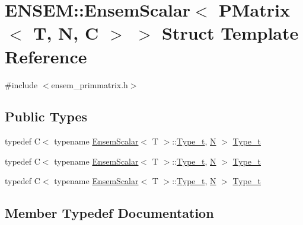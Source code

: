 \hypertarget{structENSEM_1_1EnsemScalar_3_01PMatrix_3_01T_00_01N_00_01C_01_4_01_4}{}\section{E\+N\+S\+EM\+:\+:Ensem\+Scalar$<$ P\+Matrix$<$ T, N, C $>$ $>$ Struct Template Reference}
\label{structENSEM_1_1EnsemScalar_3_01PMatrix_3_01T_00_01N_00_01C_01_4_01_4}


{\ttfamily \#include $<$ensem\+\_\+primmatrix.\+h$>$}

\subsection*{Public Types}
\begin{DoxyCompactItemize}
\item 
typedef C$<$ typename \mbox{\hyperlink{structENSEM_1_1EnsemScalar}{Ensem\+Scalar}}$<$ T $>$\+::\mbox{\hyperlink{structENSEM_1_1EnsemScalar_3_01PMatrix_3_01T_00_01N_00_01C_01_4_01_4_a63cd7ffca7507ffb61823092f6d0f8db}{Type\+\_\+t}}, \mbox{\hyperlink{adat__devel_2lib_2hadron_2operator__name__util_8cc_a7722c8ecbb62d99aee7ce68b1752f337}{N}} $>$ \mbox{\hyperlink{structENSEM_1_1EnsemScalar_3_01PMatrix_3_01T_00_01N_00_01C_01_4_01_4_a63cd7ffca7507ffb61823092f6d0f8db}{Type\+\_\+t}}
\item 
typedef C$<$ typename \mbox{\hyperlink{structENSEM_1_1EnsemScalar}{Ensem\+Scalar}}$<$ T $>$\+::\mbox{\hyperlink{structENSEM_1_1EnsemScalar_3_01PMatrix_3_01T_00_01N_00_01C_01_4_01_4_a63cd7ffca7507ffb61823092f6d0f8db}{Type\+\_\+t}}, \mbox{\hyperlink{adat__devel_2lib_2hadron_2operator__name__util_8cc_a7722c8ecbb62d99aee7ce68b1752f337}{N}} $>$ \mbox{\hyperlink{structENSEM_1_1EnsemScalar_3_01PMatrix_3_01T_00_01N_00_01C_01_4_01_4_a63cd7ffca7507ffb61823092f6d0f8db}{Type\+\_\+t}}
\item 
typedef C$<$ typename \mbox{\hyperlink{structENSEM_1_1EnsemScalar}{Ensem\+Scalar}}$<$ T $>$\+::\mbox{\hyperlink{structENSEM_1_1EnsemScalar_3_01PMatrix_3_01T_00_01N_00_01C_01_4_01_4_a63cd7ffca7507ffb61823092f6d0f8db}{Type\+\_\+t}}, \mbox{\hyperlink{adat__devel_2lib_2hadron_2operator__name__util_8cc_a7722c8ecbb62d99aee7ce68b1752f337}{N}} $>$ \mbox{\hyperlink{structENSEM_1_1EnsemScalar_3_01PMatrix_3_01T_00_01N_00_01C_01_4_01_4_a63cd7ffca7507ffb61823092f6d0f8db}{Type\+\_\+t}}
\end{DoxyCompactItemize}


\subsection{Member Typedef Documentation}
\mbox{\label{structENSEM_1_1EnsemScalar_3_01PMatrix_3_01T_00_01N_00_01C_01_4_01_4_a63cd7ffca7507ffb61823092f6d0f8db}} 

